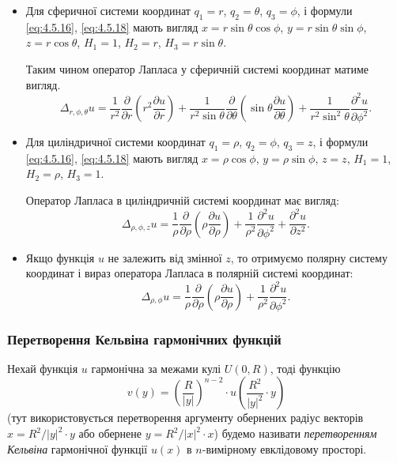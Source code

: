 \begin{itemize}
	\item Для сферичної системи координат $q_1 = r$, $q_2 = \theta$, $q_3 = \phi$, і формули \eqref{eq:4.5.16}, \eqref{eq:4.5.18} мають вигляд $x = r \sin \theta \cos \phi$, $y = r \sin \theta \sin \phi$, $z = r \cos \theta$, $H_1 = 1$, $H_2 = r$, $H_3 = r \sin \theta$. \medskip

	Таким чином оператор Лапласа у сферичній системі координат матиме вигляд.
	\begin{equation}
		\label{eq:4.5.19}
		\Delta_{r, \phi, \theta} u = \frac{1}{r^2} \frac{\partial}{\partial r} \left( r^2 \frac{\partial u}{\partial r} \right) + \frac{1}{r^2 \sin \theta} \frac{\partial}{\partial \theta} \left( \sin \theta \frac{\partial u}{\partial \theta} \right) + \frac{1}{r^2 \sin^2 \theta} \frac{\partial^2 u}{\partial \phi^2}.
	\end{equation}

	\item Для циліндричної системи координат $q_1 = \rho$, $q_2 = \phi$, $q_3 = z$, і формули \eqref{eq:4.5.16}, \eqref{eq:4.5.18} мають вигляд $x = \rho \cos \phi$, $y = \rho \sin \phi$, $z = z$, $H_1 = 1$, $H_2 = \rho$, $H_3 = 1$. \medskip

	Оператор Лапласа в циліндричній системі координат має вигляд:
	\begin{equation}
		\Delta_{\rho,\phi,z} u = \frac{1}{\rho} \frac{\partial}{\partial \rho} \left( \rho \frac{\partial u}{\partial \rho} \right) + \frac{1}{\rho^2} \frac{\partial^2 u}{\partial \phi^2} + \frac{\partial^2 u}{\partial z^2}.
	\end{equation}

	\item Якщо функція $u$ не залежить від змінної $z$, то отримуємо полярну систему координат і вираз оператора Лапласа в полярній системі координат:
	\begin{equation}
		\Delta_{\rho,\phi} u = \frac{1}{\rho} \frac{\partial}{\partial \rho} \left( \rho \frac{\partial u}{\partial \rho} \right) + \frac{1}{\rho^2} \frac{\partial^2 u}{\partial \phi^2}.
	\end{equation}
\end{itemize}

\subsubsection{Перетворення Кельвіна гармонічних функцій}

\begin{definition}
	Нехай функція $u$ гармонічна за межами кулі $U(0, R)$, тоді функцію
	\begin{equation}
		\label{eq:4.5.22}
		v(y) = \left( \frac{R}{|y|} \right)^{n - 2} \cdot u \left( \frac{R^2}{|y|^2} \cdot y \right)
	\end{equation}
	(тут використовується перетворення аргументу обернених радіус векторів $x = R^2 / |y|^2 \cdot y$ або обернене $y = R^2 / |x|^2 \cdot x$) будемо називати \textit{перетворенням Кельвіна} гармонічної функції $u(x)$ в $n$-вимірному евклідовому просторі.
\end{definition}

